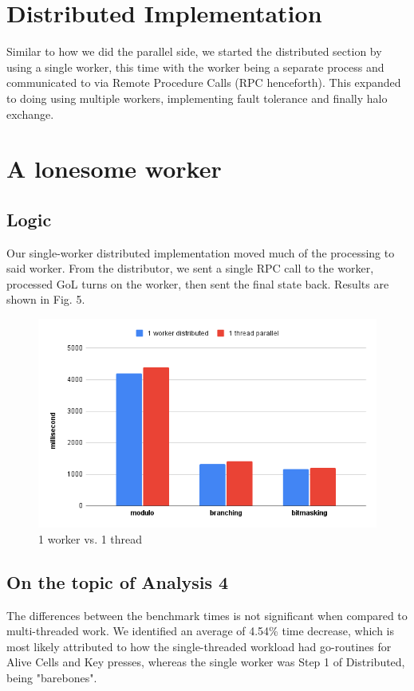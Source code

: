 \documentclass[twoside,twocolumn]{article}
\begin{document}
\section{Distributed Implementation}
Similar to how we did the parallel side, we started the distributed section by using a single worker, this time
with the worker being a separate process and communicated to via Remote Procedure Calls (RPC henceforth). This expanded to
doing using multiple workers, implementing fault tolerance and finally halo exchange.

\section{A lonesome worker}
\subsection{Logic}
Our single-worker distributed implementation moved much of the processing to said worker. From the distributor, we sent a 
single RPC call to the worker, processed GoL turns on the worker, then sent the final state back. Results are shown in Fig. 5.
\begin{figure}
  \includegraphics[width=\linewidth]{para-v-dist.png}
  \caption{1 worker vs. 1 thread}
  \label{fig:chart5}
\end{figure}
\subsection{On the topic of Analysis 4}
The differences between the benchmark times is not significant when compared to multi-threaded work. We 
identified an average of 4.54\% time decrease, which is most likely attributed to how the single-threaded workload had 
go-routines for Alive Cells and Key presses, whereas the single worker was Step 1 of Distributed, being "barebones".
\end{document}
